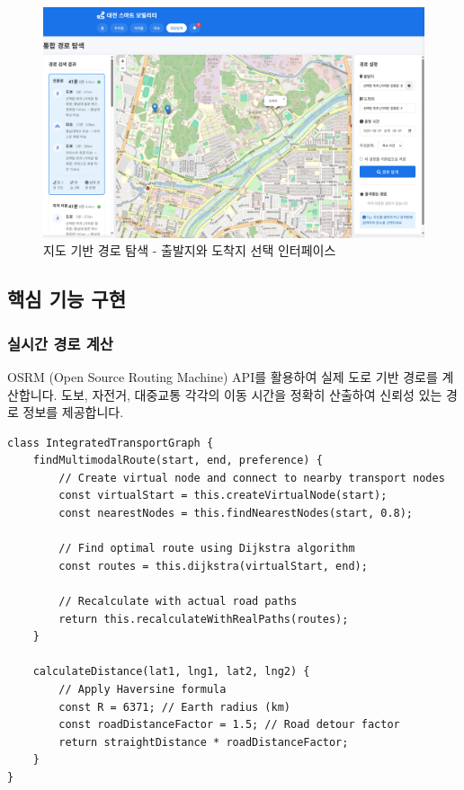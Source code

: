 \begin{figure}[h]
    \includegraphics[width=\columnwidth]{2/daejeon-2.png}
    \caption{지도 기반 경로 탐색 - 출발지와 도착지 선택 인터페이스}
    \label{fig:route_selection}
\end{figure}

\subsection{핵심 기능 구현}

\subsubsection{실시간 경로 계산}
OSRM (Open Source Routing Machine) API를 활용하여 실제 도로 기반 경로를 계산합니다. 도보, 자전거, 대중교통 각각의 이동 시간을 정확히 산출하여 신뢰성 있는 경로 정보를 제공합니다.

\begin{verbatim}
class IntegratedTransportGraph {
    findMultimodalRoute(start, end, preference) {
        // Create virtual node and connect to nearby transport nodes
        const virtualStart = this.createVirtualNode(start);
        const nearestNodes = this.findNearestNodes(start, 0.8);
        
        // Find optimal route using Dijkstra algorithm
        const routes = this.dijkstra(virtualStart, end);
        
        // Recalculate with actual road paths
        return this.recalculateWithRealPaths(routes);
    }
    
    calculateDistance(lat1, lng1, lat2, lng2) {
        // Apply Haversine formula
        const R = 6371; // Earth radius (km)
        const roadDistanceFactor = 1.5; // Road detour factor
        return straightDistance * roadDistanceFactor;
    }
}
\end{verbatim}

